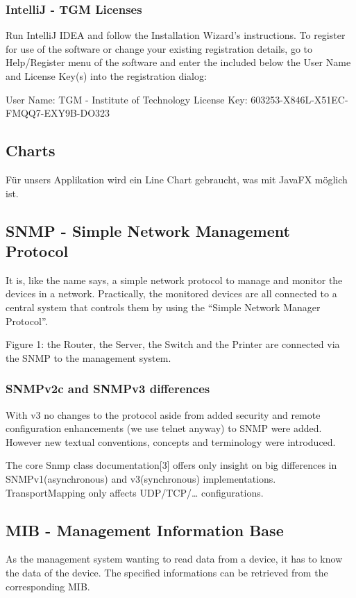 \documentclass[11pt, a4paper]{article}
\begin{document}
\subsubsection{IntelliJ - TGM Licenses}
Run IntelliJ IDEA and follow the Installation Wizard's instructions. To register for use of the software or change your existing registration details, go to Help/Register menu of the software and enter the included below the User Name and License Key(s) into the registration dialog:

User Name: TGM - Institute of Technology 
License Key: 603253-X846L-X51EC-FMQQ7-EXY9B-DO323

\subsection{Charts}
Für unsers Applikation wird ein Line Chart gebraucht, was mit JavaFX möglich ist. 

\subsection{SNMP - Simple Network Management Protocol}

It is, like the name says, a simple network protocol to manage and monitor the devices in a network. Practically, the monitored devices are all connected to a central system that controls them by using the “Simple Network Manager Protocol”.

Figure 1: the Router, the Server, the Switch and the Printer are connected via the SNMP to the management system.

\subsubsection{SNMPv2c and SNMPv3 differences}

With v3 no changes to the protocol aside from added security and remote configuration enhancements (we use telnet anyway) to SNMP were added. However new textual conventions, concepts and terminology were introduced.

The core Snmp class documentation[3] offers only insight on big differences in SNMPv1(asynchronous) and v3(synchronous) implementations. TransportMapping only affects UDP/TCP/… configurations.

\subsection{MIB - Management Information Base}
As the management system wanting to read data from a device, it has to know the data of the device. The specified informations can be retrieved from the corresponding MIB. 
\end{document}
